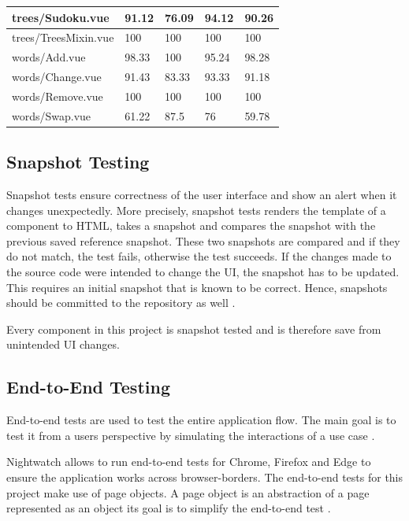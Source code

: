 \begin{table}
\begin{tabular}{|l|l|l|l|l|}
        trees/Sudoku.vue & 91.12 & 76.09 & 94.12 & 90.26 \\ \hline
        trees/TreesMixin.vue & 100 & 100 & 100 & 100 \\ \hline
        words/Add.vue & 98.33 & 100 & 95.24 & 98.28 \\ \hline
        words/Change.vue & 91.43 & 83.33 & 93.33 & 91.18 \\ \hline
        words/Remove.vue & 100 & 100 & 100 & 100 \\ \hline
        words/Swap.vue & 61.22 & 87.5 & 76 & 59.78 \\ \hline
    \end{tabular}
    \label{table:testCoverage}
\end{table}

\subsection{Snapshot Testing}
\label{subsection:snapshotTesting}
Snapshot tests ensure correctness of the user interface and show an alert when it changes unexpectedly. More precisely, snapshot tests renders the template of a component to HTML, takes a snapshot and compares the snapshot with the previous saved reference snapshot. These two snapshots are compared and if they do not match, the test fails, otherwise the test succeeds. If the changes made to the source code were intended to change the UI, the snapshot has to be updated. This requires an initial snapshot that is known to be correct. Hence, snapshots should be committed to the repository as well \cite{Jest}.

Every component in this project is snapshot tested and is therefore save from unintended UI changes.

\subsection{End-to-End Testing}
\label{subsection:e2e}
End-to-end tests are used to test the entire application flow. The main goal is to test it from a users perspective by simulating the interactions of a use case \cite{EndToEndTests}. 

Nightwatch allows to run end-to-end tests for Chrome, Firefox and Edge to ensure the application works across browser-borders. The end-to-end tests for this project make use of page objects. A page object is an abstraction of a page represented as an object its goal is to simplify the end-to-end test \cite{Nightwatch}.

